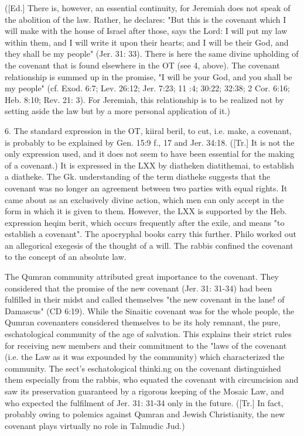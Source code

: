 				([Ed.] There is, however, an essential continuity, for Jeremiah does not speak of the abolition of the law. Rather, he declares: "But this is the covenant which I will make with the house of Israel after those, says the Lord: I will put my law within them, and I will write it upon their hearts; and I will be their God, and they shall be my people" (Jer. 31: 33). There is here the same divine upholding of the covenant that is found elsewhere in the OT (see 4, above). The covenant relationship is summed up in the promise, "I will be your God, and you shall be my people" (cf. Exod. 6:7; Lev. 26:12; Jer. 7:23; 11 :4; 30:22; 32:38; 2 Cor. 6:16; Heb. 8:10; Rev. 21: 3). For Jeremiah, this relationship is to be realized not by setting aside the law but by a more personal application of it.) 

				6. The standard expression in the OT, kiiral beril, to cut, i.e. make, a covenant, is probably to be explained by Gen. 15:9 f., 17 and Jer. 34:18. ([Tr.] It is not the only expression used, and it does not seem to have been essential for the making of a covenant.) It is expressed in the LXX by diatheken diatithemai, to establish a diatheke. The Gk. understanding of the term diatheke suggests that the covenant was no longer an agreement between two parties with equal rights. It came about as an exclusively divine action, which men can only accept in the form in which it is given to them. However, the LXX is supported by the Heb. expression heqim berit, which occurs frequently after the exile, and means "to establish a covenant". The apocryphal books carry this further. Philo worked out an allegorical exegesis of the thought of a will. The rabbis confined the covenant to the concept of an absolute law. 

				The Qumran community attributed great importance to the covenant. They considered that the promise of the new covenant (Jer. 31: 31-34) had been fulfilled in their midst and called themselves "the new covenant in the lane! of Damascus" (CD 6:19). While the Sinaitic covenant was for the whole people, the Qumran covenanters considered themselves to be its holy remnant, the pure, eschatological community of the age of salvation. This explains their strict rules for receiving new members and their commitment to the "laws of the covenant (i.e. the Law as it was expounded by the community) which characterized the community. The sect's eschatological thinki.ng on the covenant distinguished them especially from the rabbis, who equated the covenant with circumcision and saw its preservation guaranteed by a rigorous keeping of the Mosaic Law, and who expected the fulfilment of Jer. 31: 31-34 only in the future. ([Tr.] In fact, probably owing to polemics against Qumran and Jewish Christianity, the new covenant plays virtually no role in Talmudic Jud.) 


